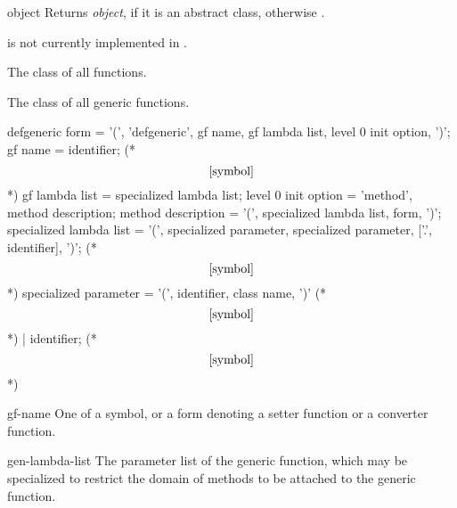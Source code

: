 %
%
\begin{arguments}
    \item[object] Returns {\em object\/}, if it is an abstract class, otherwise
    \nil.
\end{arguments}
%
\begin{note}
     is not currently implemented in \youtoo.
\end{note}
%
\begin{optDefinition}
%
%
The class of all functions.

%
The class of all generic functions.

\label{defgeneric-0}
%
\Syntax
\savesyntax{}\vbox{\small\syntax
defgeneric form
   = '(', 'defgeneric', gf name, gf lambda list,
     {level 0 init option}, ')';
gf name
   = identifier;     (* \[\ref{symbol}\] *)
gf lambda list
   = specialized lambda list;
level 0 init option
   = 'method', method description;
method description
   = '(', specialized lambda list, {form}, ')';
specialized lambda list
   = '(', specialized parameter,
     {specialized parameter},
     ['.', identifier], ')';     (* \[\ref{symbol}\] *)
specialized parameter
   = '(', identifier, class name, ')'     (* \[\ref{symbol}\] *)
   | identifier;     (* \[\ref{symbol}\] *)
\endsyntax}
\label{defgeneric-syntax-table}
%
\begin{arguments}
    \item[gf-name] One of a symbol, or a form denoting a setter function or a
    converter function.

    \item[gen-lambda-list] The parameter list of the generic function, which may
    be specialized to restrict the domain of methods to be attached to the
    generic function.


\end{arguments}
\end{optDefinition}
